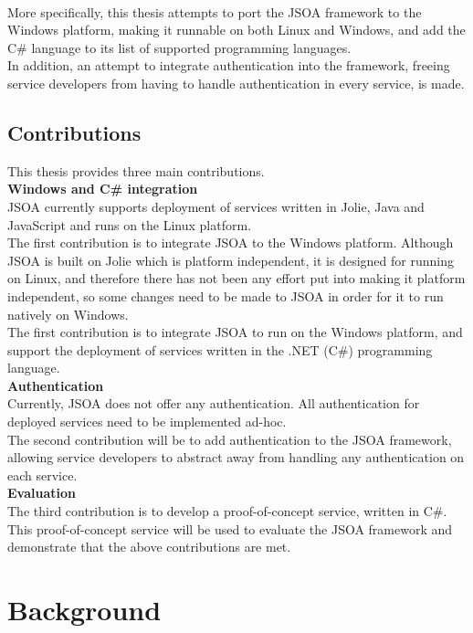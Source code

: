 \documentclass[12pt,a4paper]{article}
\begin{document}
~\\
More specifically, this thesis attempts to port the JSOA framework to the Windows platform, making it runnable on both Linux and Windows, and add the C\# language to its list of supported programming languages.\\
In addition, an attempt to integrate authentication into the framework, freeing service developers from having to handle authentication in every service, is made.

\newpage
\subsection{Contributions}\label{subsec:Contributions}
This thesis provides three main contributions. \\

\textbf{Windows and C\# integration}\\
JSOA currently supports deployment of services written in Jolie, Java and JavaScript and runs on the Linux platform.\\
The first contribution is to integrate JSOA to the Windows platform. Although JSOA is built on Jolie which is platform independent, it is designed for running on Linux, and therefore there has not been any effort put into making it platform independent, so some changes need to be made to JSOA in order for it to run natively on Windows. \\
The first contribution is to integrate JSOA to run on the Windows platform, and support the deployment of services written in the .NET (C\#) programming language.\\

\textbf{Authentication}\\
Currently, JSOA does not offer any authentication. All authentication for deployed services need to be implemented ad-hoc.\\
The second contribution will be to add authentication to the JSOA framework, allowing service developers to abstract away from handling any authentication on each service. \\

\textbf{Evaluation}\\
The third contribution is to develop a proof-of-concept service, written in C\#. This proof-of-concept service will be used to evaluate the JSOA framework and demonstrate that the above contributions are met.

\newpage
\section{Background}\label{sec:Background}
\end{document}
